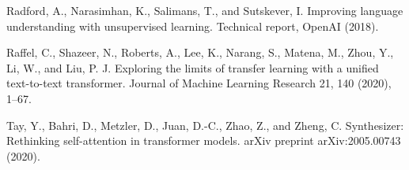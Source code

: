 \documentclass[letterpaper,12pt]{article}
\begin{document}
	
	
		
\renewcommand{\refname}{References}
		
\begin{thebibliography}{00}
			
	\label{cite:b1}
		Radford, A., Narasimhan, K., Salimans, T., and Sutskever, I. Improving language understanding with unsupervised learning. Technical report, OpenAI (2018).
			
	\label{cite:b2}
		Raffel, C., Shazeer, N., Roberts, A., Lee, K., Narang, S., Matena, M., Zhou, Y., Li, W., and Liu, P. J. Exploring the limits of transfer learning with a unified text-to-text transformer. Journal of Machine Learning Research 21, 140 (2020), 1–67.
			
	\label{cite:b3}
		Tay, Y., Bahri, D., Metzler, D., Juan, D.-C., Zhao, Z., and Zheng, C. Synthesizer: Rethinking self-attention in transformer models. arXiv preprint arXiv:2005.00743 (2020).
			
			
			
\end{thebibliography}
		
%		
%		
		
		
	
\end{document}
